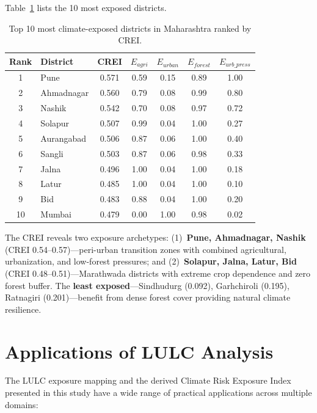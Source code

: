 \documentclass[12pt,a4paper]{article}
\begin{document}
Table~\ref{tab:risk_top10} lists the 10 most exposed districts.

\begin{table}[H]
\centering
\caption{Top 10 most climate-exposed districts in Maharashtra ranked by CREI.}
\label{tab:risk_top10}
\begin{tabular}{clccccc}
\toprule
\textbf{Rank} & \textbf{District} & \textbf{CREI} & \textbf{$E_{agri}$} & \textbf{$E_{urban}$} & \textbf{$E_{forest}$} & \textbf{$E_{urb\_press}$} \\
\midrule
1  & Pune        & 0.571 & 0.59 & 0.15 & 0.89 & 1.00 \\
2  & Ahmadnagar  & 0.560 & 0.79 & 0.08 & 0.99 & 0.80 \\
3  & Nashik      & 0.542 & 0.70 & 0.08 & 0.97 & 0.72 \\
4  & Solapur     & 0.507 & 0.99 & 0.04 & 1.00 & 0.27 \\
5  & Aurangabad  & 0.506 & 0.87 & 0.06 & 1.00 & 0.40 \\
6  & Sangli      & 0.503 & 0.87 & 0.06 & 0.98 & 0.33 \\
7  & Jalna       & 0.496 & 1.00 & 0.04 & 1.00 & 0.18 \\
8  & Latur       & 0.485 & 1.00 & 0.04 & 1.00 & 0.10 \\
9  & Bid         & 0.483 & 0.88 & 0.04 & 1.00 & 0.20 \\
10 & Mumbai      & 0.479 & 0.00 & 1.00 & 0.98 & 0.02 \\
\bottomrule
\end{tabular}
\end{table}

The CREI reveals two exposure archetypes: (1)~\textbf{Pune, Ahmadnagar, Nashik} (CREI 0.54--0.57)---peri-urban transition zones with combined agricultural, urbanization, and low-forest pressures; and (2)~\textbf{Solapur, Jalna, Latur, Bid} (CREI 0.48--0.51)---Marathwada districts with extreme crop dependence and zero forest buffer. The \textbf{least exposed}---Sindhudurg (0.092), Garhchiroli (0.195), Ratnagiri (0.201)---benefit from dense forest cover providing natural climate resilience.

\section{Applications of LULC Analysis}

The LULC exposure mapping and the derived Climate Risk Exposure Index presented in this study have a wide range of practical applications across multiple domains:
\end{document}
